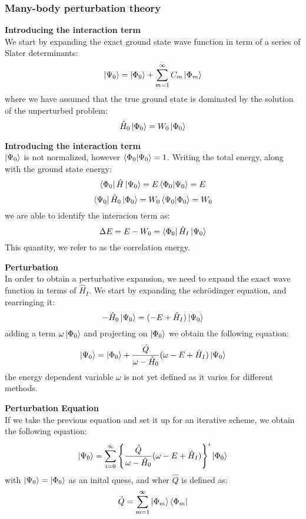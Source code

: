\documentclass[UKenglish,aspectratio=169,12pt]{beamer}
\begin{document}
\begin{frame}
    \frametitle{Many-body perturbation theory}
    \textbf{Introducing the interaction term}\\
    We start by expanding the exact ground state wave function in term of a series of Slater determinants:
    \[
        \ket{\Psi_0} = \ket{\Phi_0} + \sum_{m=1}^\infty C_m \ket{ \Phi_m}
    \]
    where we have assumed that the true ground state is dominated by the solution of the unperturbed problem: 
    \[
        \hat{H}_0 \ket{\Phi_0} = W_0 \ket{\Phi_0}
    \]
\end{frame}
\begin{frame}
\textbf{Introducing the interaction term}\\
  $\ket{\Psi_0}$ is not normalized, however $\bra{ \Phi_0} \ket{\Psi_0} = 1$.
  Writing the total energy, along with the ground state energy:
  \[
    \bra{ \Phi_0}\hat{H} \ket{ \Psi_0} = E \bra{\Phi_0}\ket{\Psi_0}=E
  \]
  \[
    \bra{ \Psi_0}\hat{H}_{0} \ket{ \Phi_0} = W_0 \bra{\Psi_0}\ket{\Phi_0}=W_0
  \]
  we are able to identify the interacion term as:
  \[
    \Delta E = E-W_0 = \bra{ \Phi_0} \hat{H}_I \ket{\Psi_0}
  \]
  This quantity, we refer to as the correlation energy.
\end{frame}

\begin{frame}
    \textbf{Perturbation}\\
     In order to obtain a perturbative expansion, we need to expand the exact wave function in terms of $\hat{H}_I$. We start by expanding the schrödinger equation, and rearringing it:
     \[
        - \hat{H}_0 \ket{ \Psi_0} = (-E + \hat{H}_I) \ket{\Psi_0}
     \]
     adding a term $\omega \ket{\Phi_0}$ and projecting on $\ket{\Phi_0}$ we obtain the following equation:
     \[
        \ket{\Psi_0} = \ket{\Phi_0} + \frac{\hat{Q}}{\omega-\hat{H}_0} (\omega-E+\hat{H}_I)\ket{\Psi_0}
     \]
     the energy dependent variable $\omega$ is not yet defined as it varies for different methods.
\end{frame}

\begin{frame}
    \textbf{Perturbation Equation}\\
    If we take the previous equation and set it up for an iterative scheme, we obtain the following equation:
    \[
        \ket{\Psi_0} = \sum_{i=0}^\infty \left\{\frac{\hat{Q}}{\omega-\hat{H}_0}(\omega-E+\hat{H}_I)\right\}^i \ket{\Phi_0}
    \]
    with $\ket{\Psi_0} = \ket{\Phi_0}$ as an inital quess, and wher $\hat{Q}$ is defined as:
    \[
    \hat{Q} = \sum_{m=1}^{\infty} \ket{\Phi_m}\bra{\Phi_m}
    \]
\end{frame}
\end{document}

